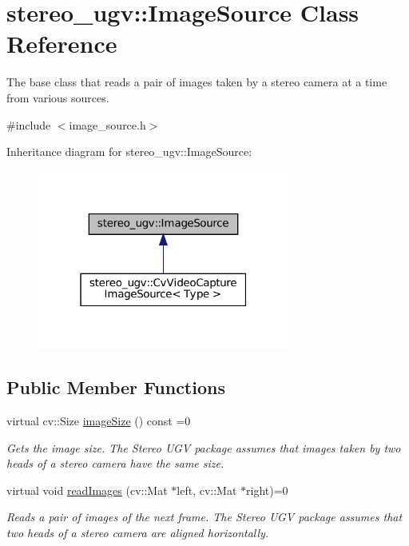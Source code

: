 \hypertarget{classstereo__ugv_1_1ImageSource}{}\section{stereo\+\_\+ugv\+:\+:Image\+Source Class Reference}
\label{classstereo__ugv_1_1ImageSource}


The base class that reads a pair of images taken by a stereo camera at a time from various sources.  




{\ttfamily \#include $<$image\+\_\+source.\+h$>$}



Inheritance diagram for stereo\+\_\+ugv\+:\+:Image\+Source\+:
\nopagebreak
\begin{figure}[H]
\begin{center}
\leavevmode
\includegraphics[width=235pt]{classstereo__ugv_1_1ImageSource__inherit__graph}
\end{center}
\end{figure}
\subsection*{Public Member Functions}
\begin{DoxyCompactItemize}
\item 
virtual cv\+::\+Size \hyperlink{classstereo__ugv_1_1ImageSource_a30d9146abcdcef11f03685a9887b96d0}{image\+Size} () const =0
\begin{DoxyCompactList}\small\item\em Gets the image size. The Stereo U\+GV package assumes that images taken by two heads of a stereo camera have the same size. \end{DoxyCompactList}\item 
virtual void \hyperlink{classstereo__ugv_1_1ImageSource_a3d87f7b09cd8889fcbee3efb29a0c39c}{read\+Images} (cv\+::\+Mat $\ast$left, cv\+::\+Mat $\ast$right)=0
\begin{DoxyCompactList}\small\item\em Reads a pair of images of the next frame. The Stereo U\+GV package assumes that two heads of a stereo camera are aligned horizontally. \end{DoxyCompactList}\end{DoxyCompactItemize}
